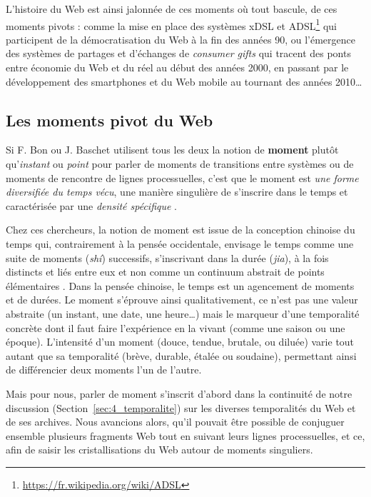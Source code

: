 \documentclass[symmetric,justified,marginals=raggedouter]{tufte-book}
\begin{document}
L'histoire du Web est ainsi jalonnée de ces moments où tout bascule, de ces moments pivots : comme la mise en place des systèmes xDSL et ADSL\footnote{\RaggedOuter \url{https://fr.wikipedia.org/wiki/ADSL}} qui participent de la démocratisation du Web à la fin des années 90, ou l'émergence des systèmes de partages et d'échanges de \textit{consumer gifts} \citep{giesler_consumer_2006} qui tracent des ponts entre économie du Web et du réel au début des années 2000, en passant par le développement des smartphones et du Web mobile au tournant des années 2010\ldots{} 

\subsection{Les moments pivot du Web}

\noindent Si F. Bon ou J. Baschet utilisent tous les deux la notion de \textbf{moment} plutôt qu'\textit{instant} ou \textit{point} pour parler de moments de transitions entre systèmes ou de moments de rencontre de lignes processuelles, c'est que le moment est \og\textit{une forme diversifiée du temps vécu}\fg{}, une manière singulière de s'inscrire dans le temps et caractérisée par une \og\textit{densité spécifique}\fg{} \citep[p.186]{baschet_defaire_2018}. 

Chez ces chercheurs, la notion de moment est issue de la conception chinoise du temps qui, contrairement à la pensée occidentale, envisage le temps comme une suite de moments (\textit{shí}) successifs, s'inscrivant dans la durée (\textit{jia}), à la fois distincts et liés entre eux \citep{chen_cerner_2011} et non comme un continuum abstrait de points élémentaires \citep[livre XI, chap. XV, 20]{saint_augustin_confessions_421}. Dans la pensée chinoise, le temps est un agencement de moments et de durées. Le moment s'éprouve ainsi qualitativement, ce n'est pas une valeur abstraite (un instant, une date, une heure\ldots{}) mais le marqueur d'une temporalité concrète dont il faut faire l'expérience en la vivant (comme une saison ou une époque). L'intensité d'un moment (douce, tendue, brutale, ou diluée) varie tout autant que sa temporalité (brève, durable, étalée ou soudaine), permettant ainsi de différencier deux moments l'un de l'autre.

Mais pour nous, parler de moment s'inscrit d'abord dans la continuité de notre discussion (Section~\ref{sec:4_temporalite}) sur les diverses temporalités du Web et de ses archives. Nous avancions alors, qu'il pouvait être possible de conjuguer ensemble plusieurs fragments Web tout en suivant leurs lignes processuelles, et ce, afin de saisir les cristallisations du Web autour de moments singuliers. 
\end{document}
